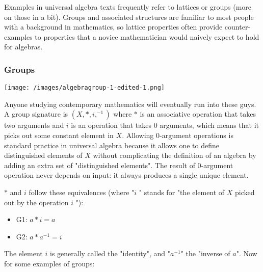 \documentclass{article}
\begin{document}
Examples in universal algebra texts frequently refer to lattices or groups (more on those in a bit). Groups and associated structures are familiar to most people with a background in mathematics, so lattice properties often provide counter-examples to properties that a novice mathematician would naively expect to hold for algebras.

\subsubsection{Groups}

\texttt{[image: /images/algebragroup-1-edited-1.png]}

Anyone studying contemporary mathematics will eventually run into these guys. A group signature is $ (X, \ast, i, ^{-1})$ where $ \ast$ is an associative operation that takes two arguments and $ i$ is an operation that takes 0 arguments, which means that it picks out some constant element in $ X$. Allowing 0-argument operations is standard practice in universal algebra because it allows one to define distinguished elements of $ X$ without complicating the definition of an algebra by adding an extra set of "distinguished elements". The result of 0-argument operation never depends on input: it always produces a single unique element.

$ \ast$ and $i$ follow these equivalences (where "$ i$ " stands for "the element of $ X$ picked out by the operation $ i$ "):

\begin{itemize}
\item{G1: $ a \ast i = a$}
\item{G2: $ a \ast a^{-1} = i$}
\end{itemize}

The element $ i$ is generally called the "identity", and "$ a^{-1}$" the "inverse of $ a$". Now for some examples of groups:
\end{document}
